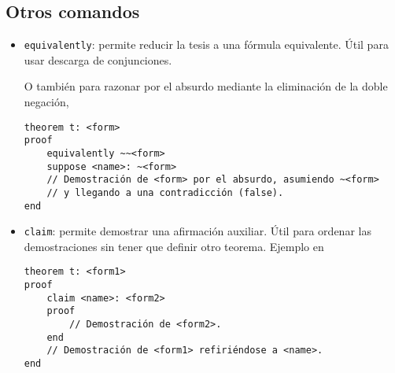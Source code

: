\subsection{Otros comandos}

\begin{itemize}
    \item \lstinline{equivalently}: permite reducir la tesis a una fórmula
    equivalente. Útil para usar descarga de conjunciones.
    
    

    O también para razonar por el absurdo mediante la eliminación de la doble
    negación,
    
    \begin{lstlisting}[numbers=none]
theorem t: <form>
proof
    equivalently ~~<form>
    suppose <name>: ~<form>
    // Demostración de <form> por el absurdo, asumiendo ~<form>
    // y llegando a una contradicción (false).
end
    \end{lstlisting}

    \item \lstinline{claim}: permite demostrar una afirmación auxiliar. Útil
    para ordenar las demostraciones sin tener que definir otro teorema. Ejemplo
    en 

    \begin{lstlisting}[numbers=none]
theorem t: <form1>
proof
    claim <name>: <form2>
    proof
        // Demostración de <form2>.
    end
    // Demostración de <form1> refiriéndose a <name>.
end
    \end{lstlisting}
\end{itemize}
